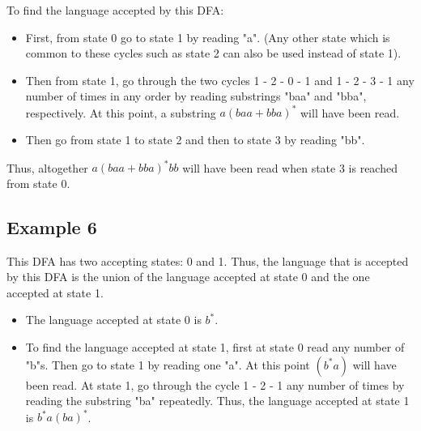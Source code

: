 \documentclass[12pt]{article}
\begin{document}
To find the language accepted by this DFA:
\begin{itemize}
    \item First, from state 0 go to state 1 by reading "a". (Any other state which is common to these cycles such as state 2 can also be used instead of state 1).
    \item Then from state 1, go through the two cycles 1 - 2 - 0 - 1 and 1 - 2 - 3 - 1 any number of times in any order by reading substrings "baa" and "bba", respectively. At this point, a substring \( a(baa + bba)^* \) will have been read.
    \item Then go from state 1 to state 2 and then to state 3 by reading "bb".
\end{itemize}
Thus, altogether \( a(baa + bba)^*bb \) will have been read when state 3 is reached from state 0.
\newpage
\subsection*{Example 6}
\begin{center}
\end{center}
This DFA has two accepting states: 0 and 1. Thus, the language that is accepted by this DFA is the union of the language accepted at state 0 and the one accepted at state 1.
\begin{itemize}
    \item The language accepted at state 0 is \( b^* \).
    \item To find the language accepted at state 1, first at state 0 read any number of "b"s. Then go to state 1 by reading one "a". At this point \( (b^*a) \) will have been read. At state 1, go through the cycle 1 - 2 - 1 any number of times by reading the substring "ba" repeatedly. Thus, the language accepted at state 1 is \( b^*a(ba)^* \).
\end{itemize}
\end{document}
